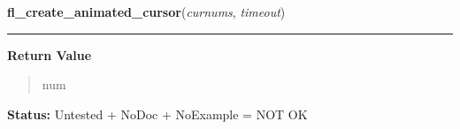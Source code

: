     \label{xformslib:library:fl_create_animated_cursor}

    \vspace{0.5ex}

\hspace{.8\funcindent}\begin{boxedminipage}{\funcwidth}

    \raggedright \textbf{fl\_create\_animated\_cursor}(\textit{curnums}, \textit{timeout})

    \vspace{-1.5ex}

    \rule{\textwidth}{0.5\fboxrule}
\setlength{\parskip}{2ex}
\setlength{\parskip}{1ex}
      \textbf{Return Value}
    \vspace{-1ex}

      \begin{quote}
      num

      \end{quote}

\textbf{Status:} Untested + NoDoc + NoExample = NOT OK



    \end{boxedminipage}

    \label{xformslib:library:fl_get_cursor_byname}

    \vspace{0.5ex}

